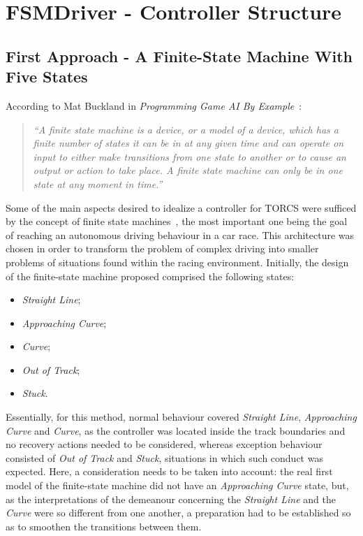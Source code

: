 \section{\textbf{FSMDriver - Controller Structure}} \label{sec:fsm}

	\subsection{First Approach - A Finite-State Machine With Five States}
	
	According to Mat Buckland in \emph{Programming Game AI By Example}~\cite{AI}:
	
	\begin{quotation}
		
		\emph{
		``A finite state machine is a device, or a model of a device, which has a finite number of states it can be in
		at any given time and can operate on input to either make transitions from one state to another or to cause
		an output or action to take place. A finite state machine can only be in one state at any moment in time.''}
		
	\end{quotation}
	
	Some of the main aspects desired to idealize a controller for TORCS were sufficed by the concept of	finite state
	machines~\cite{FSM}, the most important one being the goal of reaching an autonomous driving behaviour in a car
	race. This architecture was chosen in order to transform the problem of complex driving into smaller problems of
	situations found within the racing environment. Initially, the design of the finite-state machine proposed
	comprised the following states:
	
	\begin{itemize}

	\item \emph{Straight Line};
	\item \emph{Approaching Curve};
	\item \emph{Curve};
	\item \emph{Out of Track};
	\item \emph{Stuck}.

	\end{itemize}
	
	Essentially, for this method, normal behaviour covered \emph{Straight Line}, \emph{Approaching Curve} and
	\emph{Curve}, as the controller was located inside the track boundaries and no recovery actions needed to be
	considered, whereas exception behaviour consisted of \emph{Out of Track} and \emph{Stuck}, situations in which
	such conduct was expected. Here, a consideration needs to be taken into account: the real first model of the
	finite-state machine did not have an \emph{Approaching Curve} state, but, as the interpretations of the demeanour
	concerning the \emph{Straight Line} and the \emph{Curve} were so different from one another, a preparation had to
	be established so as to smoothen the transitions between them.
	
